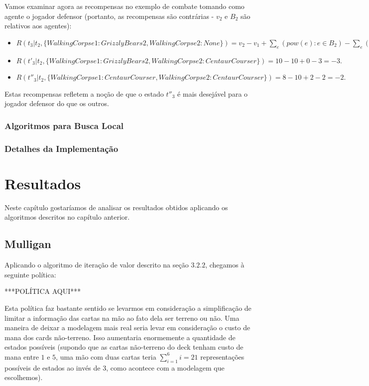 \documentclass[dvipsnames]{book}
\begin{document}
\begin{itemize}
Vamos examinar agora as recompensas no exemplo de combate tomando como agente o jogador defensor (portanto, as recompensas são contrárias - $v_2$ e $B_2$ são relativos aos agentes):

\begin{itemize}
  \item $R(t_3 | t_2, \{WalkingCorpse1 : GrizzlyBears2, WalkingCorpse2 : None\}) = v_2 - v_1 + \sum\limits_e(pow(e) : e \in B_2) - \sum\limits_e(pow(e) : e \in B_1) = 7 - 10 + 2 - 5 = -6.$
  \item $R(t'_3| t_2, \{WalkingCorpse1 : GrizzlyBears2, WalkingCorpse2 : CentaurCourser\}) = 10 - 10 + 0 - 3 = -3.$
  \item $R(t''_3| t_2, \{WalkingCorpse1 : CentaurCourser, WalkingCorpse2 : CentaurCourser\}) = 8 - 10 + 2 - 2 = -2.$
\end{itemize}
Estas recompensas refletem a noção de que o estado $t''_3$ é mais desejável para o jogador defensor do que os outros.

\end{itemize}

\subsection{Algoritmos para Busca Local}

\subsection{Detalhes da Implementação}

\chapter{Resultados}
Neste capítulo gostaríamos de analisar os resultados obtidos aplicando os algoritmos descritos no
capítulo anterior.

\section{Mulligan}
Aplicando o algoritmo de iteração de valor descrito na seção $3.2.2$, chegamos à seguinte política:

***POLÍTICA AQUI***

Esta política faz bastante sentido se levarmos em consideração a simplificação de limitar a informação
das cartas na mão ao fato dela ser terreno ou não. Uma maneira de deixar a modelagem mais real seria
levar em consideração o custo de mana dos cards não-terreno. Isso aumentaria enormemente a quantidade
de estados possíveis (supondo que as cartas não-terreno do deck tenham custo de mana entre $1$ e $5$,
uma mão com duas cartas teria $\sum\limits_{i=1}^{6}i = 21$ representações possíveis de estados ao
invés de $3$, como acontece com a modelagem que escolhemos).
\end{document}
